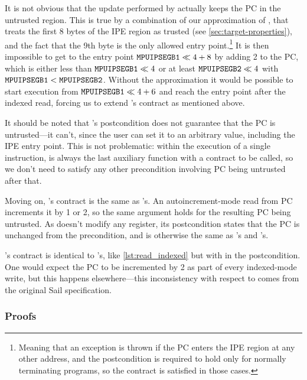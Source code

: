 It is not obvious that the update performed by  actually keeps the PC in the untrusted region. This is true by a combination of our approximation of , that treats the first 8 bytes of the IPE region as trusted (see \cref{sec:target-properties}), and the fact that the 9th byte is the only allowed entry point.\footnote{Meaning that an exception is thrown if the PC enters the IPE region at any other address, and the postcondition is required to hold only for normally terminating programs, so the contract is satisfied in those cases.} It is then impossible to get to the entry point \(\reg{MPUIPSEGB1} \ll 4 + 8\) by adding 2 to the PC, which is either less than \(\reg{MPUIPSEGB1} \ll 4\) or at least \(\reg{MPUIPSEGB2} \ll 4\) with \(\reg{MPUIPSEGB1} < \reg{MPUIPSEGB2}\). Without the approximation it would be possible to start execution from \(\reg{MPUIPSEGB1} \ll 4 + 6\) and reach the entry point after the indexed read, forcing us to extend 's contract as mentioned above.

It should be noted that 's postcondition does not guarantee that the PC is untrusted---it can't, since the user can set it to an arbitrary value, including the IPE entry point. This is not problematic: within the execution of a single instruction,  is always the last auxiliary function with a contract to be called, so we don't need to satisfy any other precondition involving PC being untrusted after that.

Moving on, 's contract is the same as 's. An auto\-increment-\-mode read from PC increments it by 1 or 2, so the same argument holds for the resulting PC being untrusted. As  doesn't modify any register, its postcondition states that the PC is unchanged from the precondition, and is otherwise the same as 's and 's.

's contract is identical to 's, \ie like \cref{lst:read_indexed} but with  in the postcondition. One would expect the PC to be incremented by 2 as part of every indexed-mode write, but this happens elsewhere---this inconsistency with respect to  comes from the original Sail specification.

\subsubsection{Proofs}

